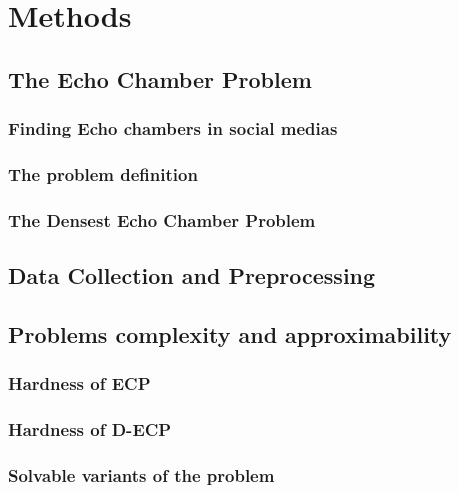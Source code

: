 \chapter{Methods}
\label{ch:methods}

\section{The Echo Chamber Problem}%
\label{sec:the_echo_chamber_problem}

\subsection{Finding Echo chambers in social medias}%
\label{sub:finding_echo_chambers_in_social_medias}

\subsection{The problem definition}%
\label{sub:the_problem_definition}

\subsection{The Densest Echo Chamber Problem}%
\label{sub:the_densest_echo_chamber_problem}

\section{Data Collection and Preprocessing}
\label{sec:dataCollection}


\section{Problems complexity and approximability}%
\label{sec:problem_complexity_and_approximability}

\subsection{Hardness of ECP}%
\label{sub:ecp_is_}

\subsection{Hardness of D-ECP}%
\label{sub:ecp_is_}

\subsection{Solvable variants of the problem}%
\label{sub:solvable_variants_of_the_problem}

